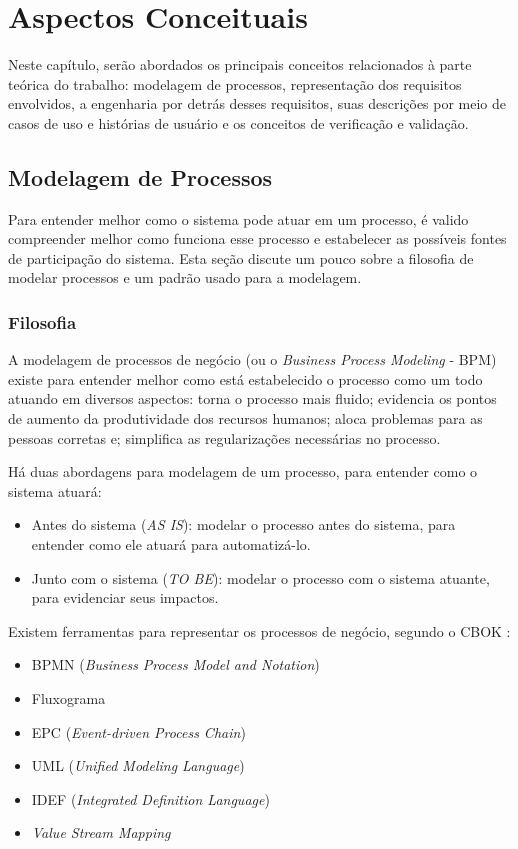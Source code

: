 \chapter{Aspectos Conceituais}\label{chap:aspectos-conceituais}
Neste capítulo, serão abordados os principais conceitos relacionados à parte teórica do trabalho: modelagem de processos, representação dos requisitos envolvidos, a engenharia por detrás desses requisitos, suas descrições por meio de casos de uso e histórias de usuário e os conceitos de verificação e validação.

\section{Modelagem de Processos}
Para entender melhor como o sistema pode atuar em um processo, é valido compreender melhor como funciona esse processo e estabelecer as possíveis fontes de participação do sistema. Esta seção discute um pouco sobre a filosofia de modelar processos e um padrão usado para a modelagem.

\subsection{Filosofia}
A modelagem de processos de negócio (ou o \textit{Business Process Modeling} - BPM) existe para entender melhor como está estabelecido o processo como um todo atuando em diversos aspectos: torna o processo mais fluido; evidencia os pontos de aumento da produtividade dos recursos humanos; aloca problemas para as pessoas corretas e; simplifica as regularizações necessárias no processo\cite{mikehavey2015}.

Há duas abordagens para modelagem de um processo, para entender como o sistema atuará\cite{jessicaangeli2018}:

\begin{itemize}
    \item Antes do sistema (\textit{AS IS}): modelar o processo antes do sistema, para entender como ele atuará para automatizá-lo.
    \item Junto com o sistema (\textit{TO BE}): modelar o processo com o sistema atuante, para evidenciar seus impactos.
\end{itemize}

Existem ferramentas para representar os processos de negócio, segundo o CBOK \cite[cap. ~3, p. 79]{cbok2013}:

\begin{itemize}
    \item BPMN (\textit{Business Process Model and Notation})
    \item Fluxograma
    \item EPC (\textit{Event-driven Process Chain})
    \item UML (\textit{Unified Modeling Language})
    \item IDEF (\textit{Integrated Definition Language})
    \item \textit{Value Stream Mapping}
\end{itemize}

